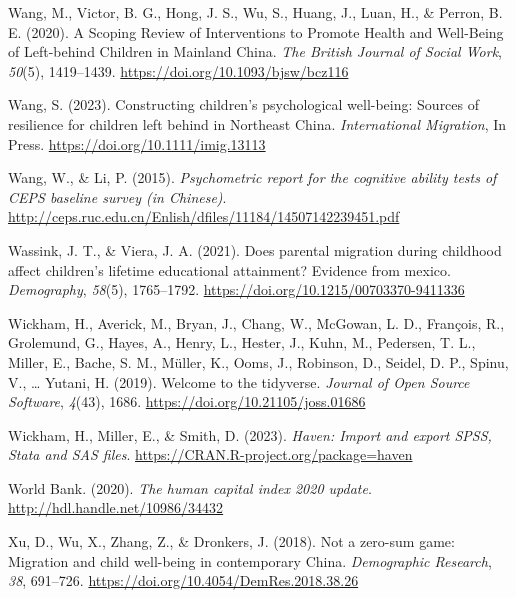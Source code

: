 \documentclass[
  man]{apa7}
\newlength{\cslhangindent}
\newlength{\cslentryspacingunit} %
\newenvironment{CSLReferences}[2] %
 {%
  \setlength{\parindent}{0pt}
  \ifodd #1
  \let\oldpar\par
  \def\par{\hangindent=\cslhangindent\oldpar}
  \fi
  \setlength{\parskip}{#2\cslentryspacingunit}
 }%
 {}
\begin{document}
\begin{CSLReferences}{1}{0}
\leavevmode{}%
Wang, M., Victor, B. G., Hong, J. S., Wu, S., Huang, J., Luan, H., \& Perron, B. E. (2020). A Scoping Review of Interventions to Promote Health and Well-Being of Left-behind Children in Mainland {China}. \emph{The British Journal of Social Work}, \emph{50}(5), 1419--1439. \url{https://doi.org/10.1093/bjsw/bcz116}

\leavevmode{}%
Wang, S. (2023). Constructing children's psychological well-being: Sources of resilience for children left behind in Northeast {China}. \emph{International Migration}, In Press. \url{https://doi.org/10.1111/imig.13113}

\leavevmode{}%
Wang, W., \& Li, P. (2015). \emph{Psychometric report for the cognitive ability tests of {CEPS} baseline survey (in {Chinese})}. \url{http://ceps.ruc.edu.cn/Enlish/dfiles/11184/14507142239451.pdf}

\leavevmode{}%
Wassink, J. T., \& Viera, J. A. (2021). Does parental migration during childhood affect children's lifetime educational attainment? Evidence from mexico. \emph{Demography}, \emph{58}(5), 1765--1792. \url{https://doi.org/10.1215/00703370-9411336}

\leavevmode{}%
Wickham, H., Averick, M., Bryan, J., Chang, W., McGowan, L. D., François, R., Grolemund, G., Hayes, A., Henry, L., Hester, J., Kuhn, M., Pedersen, T. L., Miller, E., Bache, S. M., Müller, K., Ooms, J., Robinson, D., Seidel, D. P., Spinu, V., \ldots{} Yutani, H. (2019). Welcome to the {tidyverse}. \emph{Journal of Open Source Software}, \emph{4}(43), 1686. \url{https://doi.org/10.21105/joss.01686}

\leavevmode{}%
Wickham, H., Miller, E., \& Smith, D. (2023). \emph{Haven: Import and export {SPSS}, {Stata} and {SAS} files}. \url{https://CRAN.R-project.org/package=haven}

\leavevmode{}%
World Bank. (2020). \emph{The human capital index 2020 update}. \url{http://hdl.handle.net/10986/34432}

\leavevmode{}%
Xu, D., Wu, X., Zhang, Z., \& Dronkers, J. (2018). Not a zero-sum game: Migration and child well-being in contemporary {China}. \emph{Demographic Research}, \emph{38}, 691--726. \url{https://doi.org/10.4054/DemRes.2018.38.26}


\end{CSLReferences}
\end{document}
